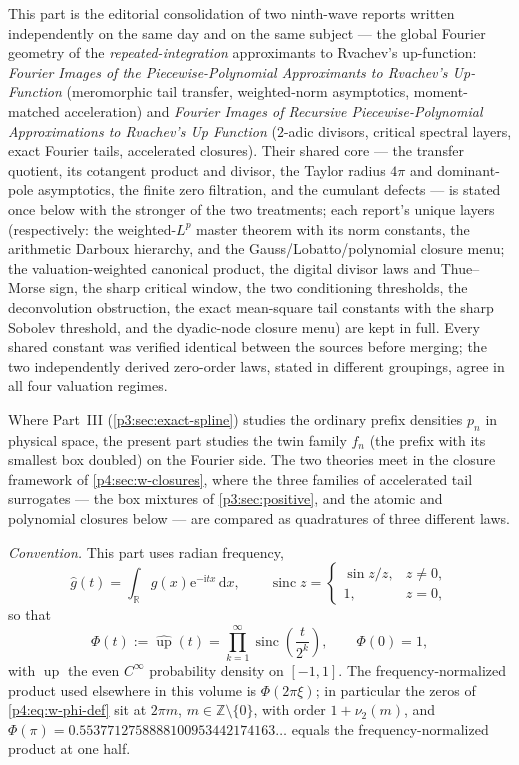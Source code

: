 \documentclass[11pt,oneside]{article}
\numberwithin{equation}{section}
\theoremstyle{definition}
\theoremstyle{remark}
\newcommand{\R}{\mathbb R}
\newcommand{\Z}{\mathbb Z}
\newcommand{\Up}{\operatorname{up}}
\newcommand{\sinc}{\operatorname{sinc}}
\newcommand{\vtwo}{\nu_2}
\newcommand{\dd}{\,\mathrm d}
\newcommand{\e}{\mathrm e}
\newcommand{\ii}{\mathrm i}
\begin{document}
This part is the editorial consolidation of two ninth-wave reports written
independently on the same day and on the same subject --- the global Fourier
geometry of the \emph{repeated-integration} approximants to Rvachev's
up-function:
\emph{Fourier Images of the Piecewise-Polynomial Approximants to Rvachev's
Up-Function} (meromorphic tail transfer, weighted-norm asymptotics,
moment-matched acceleration) and
\emph{Fourier Images of Recursive Piecewise-Polynomial Approximations to
Rvachev's Up Function} ($2$-adic divisors, critical spectral layers, exact
Fourier tails, accelerated closures).  Their shared core --- the transfer
quotient, its cotangent product and divisor, the Taylor radius $4\pi$ and
dominant-pole asymptotics, the finite zero filtration, and the cumulant
defects --- is stated once below with the stronger of the two treatments;
each report's unique layers (respectively: the weighted-$L^p$ master theorem
with its norm constants, the arithmetic Darboux hierarchy, and the
Gauss/Lobatto/polynomial closure menu; the valuation-weighted canonical
product, the digital divisor laws and Thue--Morse sign, the sharp critical
window, the two conditioning thresholds, the deconvolution obstruction, the
exact mean-square tail constants with the sharp Sobolev threshold, and the
dyadic-node closure menu) are kept in full.  Every shared constant was
verified identical between the sources before merging; the two independently
derived zero-order laws, stated in different groupings, agree in all four
valuation regimes.

Where Part~III (\cref{p3:sec:exact-spline}) studies the ordinary prefix
densities $p_n$ in physical space, the present part studies the twin family
$f_n$ (the prefix with its smallest box doubled) on the Fourier side.  The
two theories meet in the closure framework of \cref{p4:sec:w-closures}, where
the three families of accelerated tail surrogates --- the box mixtures of
\cref{p3:sec:positive}, and the atomic and polynomial closures below ---
are compared as quadratures of three different laws.

\emph{Convention.}  This part uses radian frequency,
\begin{equation}
 \widehat g(t)=\int_{\R}g(x)\e^{-\ii tx}\dd x,
 \qquad
 \sinc z=\begin{cases}\sin z/z,&z\ne0,\\1,&z=0,\end{cases}
 \label{p4:eq:w-fourier-convention}
\end{equation}
so that
\begin{equation}
 \Phi(t):=\widehat{\Up}(t)=\prod_{k=1}^{\infty}\sinc\!\left(\frac{t}{2^k}\right),
 \qquad \Phi(0)=1,
 \label{p4:eq:w-phi-def}
\end{equation}
with $\Up$ the even $C^\infty$ probability density on $[-1,1]$.  The
frequency-normalized product used elsewhere in this volume is
$\Phi(2\pi\xi)$; in particular the zeros of \eqref{p4:eq:w-phi-def} sit at
$2\pi m$, $m\in\Z\setminus\{0\}$, with order $1+\vtwo(m)$, and
$\Phi(\pi)=0.5537712758888100953442174163\ldots$ equals the
frequency-normalized product at one half.
\end{document}
